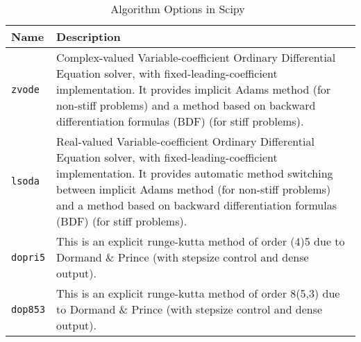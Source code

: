 \begin{table}[ht]
\begin{tabular}{ p{} p{} }
	\textbf{Name} & \textbf{Description} \\
	\toprule
	\verb|zvode| & Complex-valued Variable-coefficient Ordinary Differential Equation solver, with fixed-leading-coefficient implementation. It provides implicit Adams method (for non-stiff problems) and a method based on backward differentiation formulas (BDF) (for stiff problems).\\ \hline
	\verb|lsoda| & Real-valued Variable-coefficient Ordinary Differential Equation solver, with fixed-leading-coefficient implementation. It provides automatic method switching between implicit Adams method (for non-stiff problems) and a method based on backward differentiation formulas (BDF) (for stiff problems).\\ \hline
	\verb|dopri5| & This is an explicit runge-kutta method of order (4)5 due to Dormand \& Prince (with stepsize control and dense output).\\ \hline
	\verb|dop853| & This is an explicit runge-kutta method of order 8(5,3) due to Dormand \& Prince (with stepsize control and dense output).\\
	\bottomrule	
\end{tabular}	
\caption{Algorithm Options in Scipy~\citep{scipyfun}}	
\label{tab_algscipy}
\end{table}

